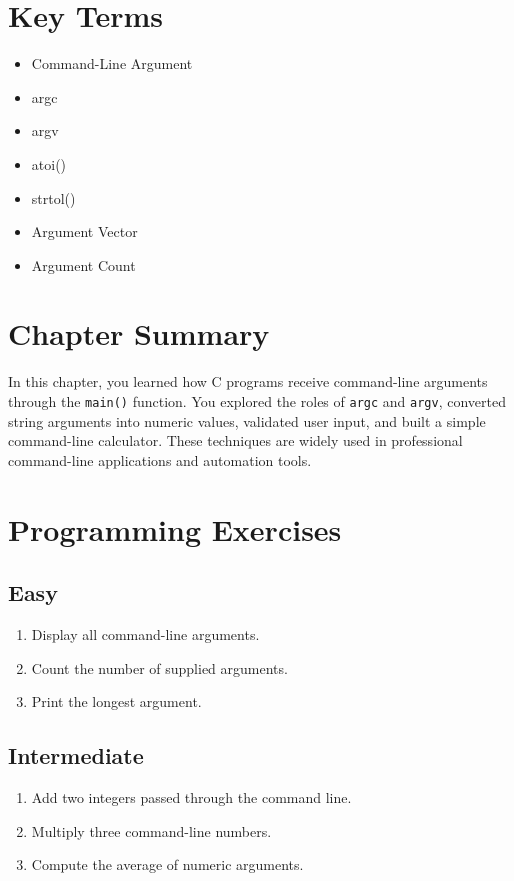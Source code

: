 \documentclass[12pt,openany]{book}
\begin{document}
\section{Key Terms}

\begin{itemize}
    \item Command-Line Argument
    \item argc
    \item argv
    \item atoi()
    \item strtol()
    \item Argument Vector
    \item Argument Count
\end{itemize}

\section{Chapter Summary}

In this chapter, you learned how C programs receive command-line arguments through the \texttt{main()} function. You explored the roles of \texttt{argc} and \texttt{argv}, converted string arguments into numeric values, validated user input, and built a simple command-line calculator. These techniques are widely used in professional command-line applications and automation tools.

\section{Programming Exercises}

\subsection*{Easy}

\begin{enumerate}
    \item Display all command-line arguments.
    \item Count the number of supplied arguments.
    \item Print the longest argument.
\end{enumerate}

\subsection*{Intermediate}

\begin{enumerate}
    \item Add two integers passed through the command line.
    \item Multiply three command-line numbers.
    \item Compute the average of numeric arguments.
\end{enumerate}
\end{document}
